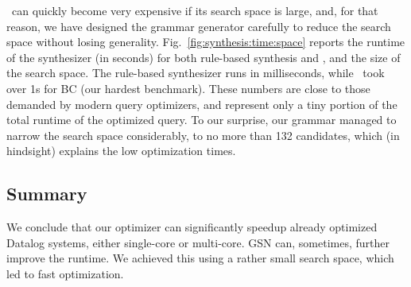     \cegis\ can quickly become very expensive if its search space is
    large, and, for that reason, we have designed the grammar generator
    carefully to reduce the search space without losing generality.
    Fig.~\ref{fig:synthesis:time:space} reports the runtime of the
    synthesizer (in seconds) for both rule-based synthesis and \cegis, and the size
    of the search space.  The rule-based synthesizer runs in
    milliseconds, while \cegis\ took over 1s for BC (our hardest
    benchmark).  These numbers are close to those demanded by modern query
    optimizers, and represent only a tiny portion of the total runtime
    of the optimized query. 
    To our surprise, our grammar managed to
    narrow the search space considerably, to no more than 132 candidates,
    which (in hindsight) explains the low optimization times. 
    
    \subsection{Summary}
    
    We conclude that our optimizer can significantly speedup already
    optimized  Datalog  systems, either single-core or multi-core.  GSN
    can, sometimes, further improve the runtime.  We achieved this using a
    rather small search space, which led to fast optimization.
    
    
    

